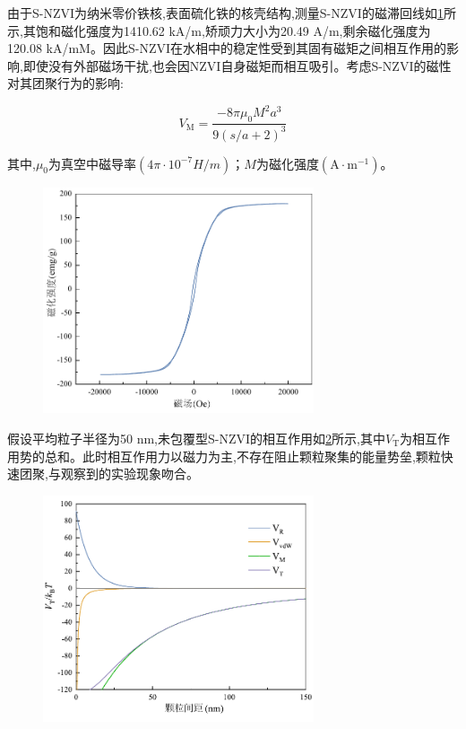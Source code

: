 由于S-NZVI为纳米零价铁核,表面硫化铁的核壳结构,测量S-NZVI的磁滞回线如\cref{fig6}所示,其饱和磁化强度为1410.62 kA/m,矫顽力大小为20.49 A/m,剩余磁化强度为120.08 kA/mM。因此S-NZVI在水相中的稳定性受到其固有磁矩之间相互作用的影响,即使没有外部磁场干扰,也会因NZVI自身磁矩而相互吸引\cite{butter2003direct}。考虑S-NZVI的磁性对其团聚行为的影响:

\begin{equation}
    V_\mathrm{M}=\frac{-8\pi \mu _0M^2a^3}{9(s/a+2)^3}
    \label{VM}
\end{equation}

其中,$\mu_0$为真空中磁导率$(4\pi\cdot10^{-7}H/m )$；$M$为磁化强度$(\mathrm{A\cdot m^{-1}})$。

\begin{figure}
    \centering
    \includegraphics[width=8cm]{figs/fig6.pdf}
    \label{fig6}
\end{figure}

假设平均粒子半径为50 nm,未包覆型S-NZVI的相互作用如\cref{fig7}所示,其中$V_\mathrm{T}$为相互作用势的总和。此时相互作用力以磁力为主,不存在阻止颗粒聚集的能量势垒,颗粒快速团聚,与观察到的实验现象吻合。

\begin{figure}[h]
    \centering
    \includegraphics[width=8cm]{figs/fig7.pdf}
    \label{fig7}
\end{figure}

